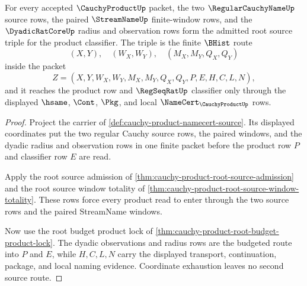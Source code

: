 \begin{theorem}
\label{thm:cauchy-product-budgeted-root-source-triple}
For every accepted $\CauchyProductUp$ packet, the two $\RegularCauchyNameUp$ source rows, the paired $\StreamNameUp$ finite-window rows, and the $\DyadicRatCoreUp$ radius and observation rows form the admitted root source triple for the product classifier. The triple is the finite $\BHist$ route
$$
(X,Y),\quad (W_X,W_Y),\quad (M_X,M_Y,Q_X,Q_Y)
$$
inside the packet
$$
Z=(X,Y,W_X,W_Y,M_X,M_Y,Q_X,Q_Y,P,E,H,C,L,N),
$$
and it reaches the product row and $\RegSeqRatUp$ classifier only through the displayed $\hsame$, $\Cont$, $\Pkg$, and local $\NameCert_{\CauchyProductUp}$ rows.
\end{theorem}
\begin{proof}
Project the carrier of \autoref{def:cauchy-product-namecert-source}. Its displayed coordinates put the two regular Cauchy source rows, the paired windows, and the dyadic radius and observation rows in one finite packet before the product row $P$ and classifier row $E$ are read.

Apply the root source admission of \autoref{thm:cauchy-product-root-source-admission} and the root source window totality of \autoref{thm:cauchy-product-root-source-window-totality}. These rows force every product read to enter through the two source rows and the paired StreamName windows.

Now use the root budget product lock of \autoref{thm:cauchy-product-root-budget-product-lock}. The dyadic observations and radius rows are the budgeted route into $P$ and $E$, while $H,C,L,N$ carry the displayed transport, continuation, package, and local naming evidence. Coordinate exhaustion leaves no second source route.
\end{proof}

